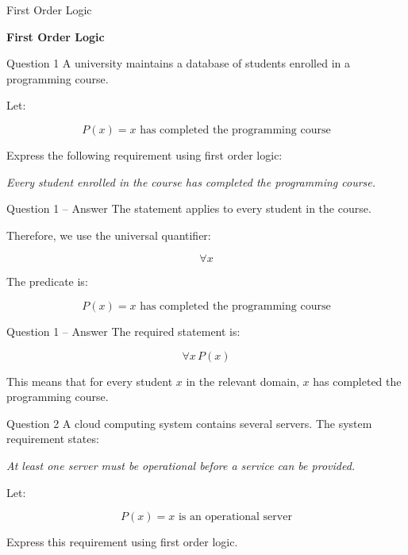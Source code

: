 \begin{frame}{First Order Logic}
\begin{center}
\vspace{1.5cm}
{\Huge\textbf{First Order Logic}}
\end{center}
\end{frame}


\begin{frame}{Question 1}
A university maintains a database of students enrolled in a programming
course.

Let:

$$
P(x) = \text{$x$ has completed the programming course}
$$

Express the following requirement using first order logic:

\begin{center}
\textit{Every student enrolled in the course has completed the programming
course.}
\end{center}
\end{frame}

\begin{frame}{Question 1 -- Answer}
The statement applies to every student in the course.

Therefore, we use the universal quantifier:

$$
\forall x
$$

The predicate is:

$$
P(x) = \text{$x$ has completed the programming course}
$$

\end{frame}

\begin{frame}{Question 1 -- Answer}
The required statement is:

$$
\boxed{\forall x\,P(x)}
$$

This means that for every student $x$ in the relevant domain,
$x$ has completed the programming course.
\end{frame}


\begin{frame}{Question 2}
A cloud computing system contains several servers. The system requirement
states:

\begin{center}
\textit{At least one server must be operational before a service can be
provided.}
\end{center}

Let:

$$
P(x) = \text{$x$ is an operational server}
$$

Express this requirement using first order logic.
\end{frame}


